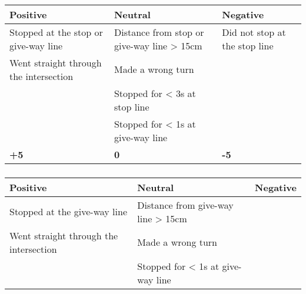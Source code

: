 {	\subsubsection*{}
	\begin{table}[H]
		\begin{tabularx}{\textwidth}{XXX}
			\toprule
			\textbf{Positive}                      & \textbf{Neutral}                           & \textbf{Negative}                              \\
			\midrule
			Stopped at the stop or give-way line   & Distance from stop or give-way line > 15cm & Did not stop at the stop line \footnotemark[1] \\
			Went straight through the intersection & Made a wrong turn                          &                                                \\
			                                       & Stopped for < 3s at stop line              &                                                \\
			                                       & Stopped for < 1s at give-way line          &                                                \\
			\topstrut
			\textbf{+5}                            & \textbf{0}                                 & \textbf{-5}                                    \\
			\bottomrule
		\end{tabularx}
	\end{table}

	\subsubsection*{}
	\begin{table}[H]
		\begin{tabularx}{\textwidth}{XXX}
			\toprule
			\textbf{Positive}                      & \textbf{Neutral}                   & \textbf{Negative}                    \\
			\midrule
			Stopped at the give-way line           & Distance from give-way line > 15cm &                                      \\
			Went straight through the intersection & Made a wrong turn                  &                                      \\
			                                       & Stopped for < 1s at give-way line  &                                      \\


\end{tabularx}
\end{table}}
